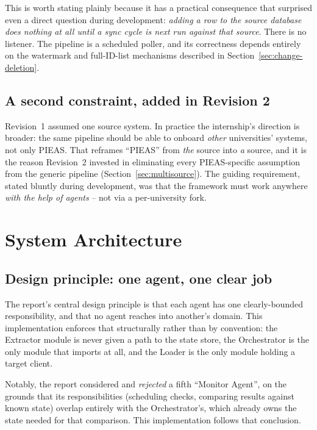 \documentclass[11pt,a4paper]{article}
\newcommand{\ttu}[1]{\texttt{\detokenize{#1}}}
\begin{document}
This is worth stating plainly because it has a practical consequence that surprised even a
direct question during development: \emph{adding a row to the source database does nothing at
all until a sync cycle is next run against that source}. There is no listener. The pipeline is
a scheduled poller, and its correctness depends entirely on the watermark and full-ID-list
mechanisms described in Section~\ref{sec:change-deletion}.

\subsection{A second constraint, added in Revision 2}

Revision~1 assumed one source system. In practice the internship's direction is broader:
the same pipeline should be able to onboard \emph{other} universities' systems, not only PIEAS.
That reframes ``PIEAS'' from \textit{the} source into \textit{a} source, and it is the reason
Revision~2 invested in eliminating every PIEAS-specific assumption from the generic pipeline
(Section~\ref{sec:multisource}). The guiding requirement, stated bluntly during development, was
that the framework must work anywhere \emph{with the help of agents} -- not via a per-university
fork.

\section{System Architecture}

\subsection{Design principle: one agent, one clear job}

The report's central design principle is that each agent has one clearly-bounded
responsibility, and that no agent reaches into another's domain. This implementation enforces
that structurally rather than by convention: the Extractor module is never given a path to the
state store, the Orchestrator is the only module that imports \ttu{sync_store.py} at all, and
the Loader is the only module holding a target client.

Notably, the report considered and \emph{rejected} a fifth ``Monitor Agent'', on the grounds
that its responsibilities (scheduling checks, comparing results against known state) overlap
entirely with the Orchestrator's, which already owns the state needed for that comparison. This
implementation follows that conclusion.
\end{document}
